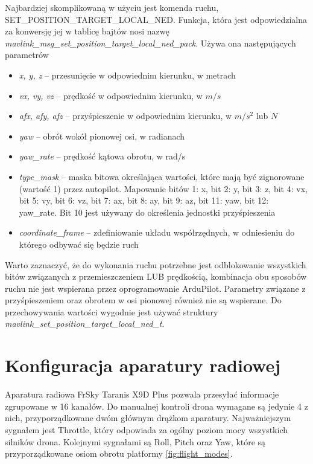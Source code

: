 Najbardziej skomplikowaną w użyciu jest komenda ruchu, SET\_POSITION\_TARGET\_LOCAL\_NED. Funkcja, która jest odpowiedzialna za konwersję jej w tablicę bajtów nosi nazwę \textit{mavlink\_msg\_set\_position\_target\_local\_ned\_pack}. Używa ona następujących parametrów
\begin{itemize}
	\item \textit{x, y, z} -- przesunięcie w odpowiednim kierunku, w metrach
	\item \textit{vx, vy, vz} -- prędkość w odpowiednim kierunku, w $m/s$
	\item \textit{afx, afy, afz} -- przyśpieszenie w odpowiednim kierunku, w $m/s^2$ lub $N$
	\item \textit{yaw} -- obrót wokół pionowej osi, w radianach
	\item \textit{yaw\_rate} -- prędkość kątowa obrotu, w rad/s
	\item \textit{type\_mask} -- maska bitowa określająca wartości, które mają być zignorowane (wartość 1) przez autopilot. Mapowanie bitów 1: x, bit 2: y, bit 3: z, bit 4: vx, bit 5: vy, bit 6: vz, bit 7: ax, bit 8: ay, bit 9: az, bit 11: yaw, bit 12: yaw\_rate. Bit 10 jest używany do określenia jednostki przyśpieszenia
	\item \textit{coordinate\_frame} -- zdefiniowanie układu współrzędnych, w odniesieniu do którego odbywać się będzie ruch
\end{itemize}
Warto zaznaczyć, że do wykonania ruchu potrzebne jest odblokowanie wszystkich bitów związanych z przemieszczeniem LUB prędkością, kombinacja obu sposobów ruchu nie jest wspierana przez oprogramowanie ArduPilot. Parametry związane z przyśpieszeniem oraz obrotem w osi pionowej również nie są wspierane.
Do przechowywania wartości wygodnie jest używać struktury \textit{mavlink\_set\_position\_target\_local\_ned\_t}.

\section{Konfiguracja aparatury radiowej}

Aparatura radiowa FrSky Taranis X9D Plus pozwala przesyłać informacje zgrupowane w 16 kanałów. Do manualnej kontroli drona wymagane są jedynie 4 z nich, przyporządkowane dwóm głównym drążkom aparatury. Najważniejszym sygnałem jest Throttle, który odpowiada za ogólny poziom mocy wszystkich silników drona. Kolejnymi sygnałami są Roll, Pitch oraz Yaw, które są przyporządkowane osiom obrotu platformy \ref{fig:flight_modes}.

